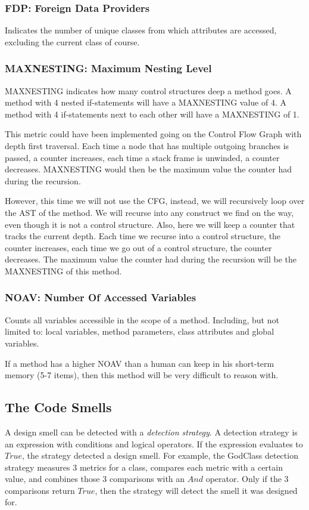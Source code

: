 \documentclass[onecolumn]{article}
\begin{document}
\subsubsection{FDP: Foreign Data Providers} \label{metric_FDP}
Indicates the number of unique classes from which attributes are accessed, excluding the current class of course.


\subsubsection{MAXNESTING: Maximum Nesting Level} \label{metric_MAXNESTING}
MAXNESTING indicates how many control structures deep a method goes. A method with 4 nested if-statements will have a MAXNESTING value of 4. A method with 4 if-statements next to each other will have a MAXNESTING of 1.

This metric could have been implemented going on the Control Flow Graph with depth first traversal. Each time a node that has multiple outgoing branches is passed, a counter increases, each time a stack frame is unwinded, a counter decreases. MAXNESTING would then be the maximum value the counter had during the recursion.

However, this time we will not use the CFG, instead, we will recursively loop over the AST of the method. We will recurse into any construct we find on the way, even though it is not a control structure. Also, here we will keep a counter that tracks the current depth. Each time we recurse into a control structure, the counter increases, each time we go out of a control structure, the counter decreases. The maximum value the counter had during the recursion will be the MAXNESTING of this method.


\subsubsection{NOAV: Number Of Accessed Variables} \label{metric_NOAV}
Counts all variables accessible in the scope of a method. Including, but not limited to: local variables, method parameters, class attributes and global variables.

If a method has a higher NOAV than a human can keep in his short-term memory (5-7 items), then this method will be very difficult to reason with.


\subsection{The Code Smells}
A design smell can be detected with a \textit{detection strategy}. A detection strategy is an expression with conditions and logical operators. If the expression evaluates to $True$, the strategy detected a design smell. For example, the GodClass detection strategy measures 3 metrics for a class, compares each metric with a certain value, and combines those 3 comparisons with an $And$ operator. Only if the 3 comparisons return $True$, then the strategy will detect the smell it was designed for.
\end{document}
